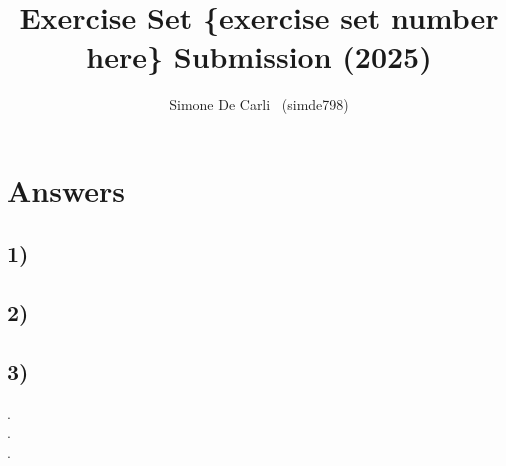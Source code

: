 \documentclass[10pt]{article}
\title{Exercise Set \{exercise set number here\} Submission (2025)}
\author{Simone De Carli \, (simde798)}
\begin{document}
\maketitle

\section*{Answers}

\subsection*{1)}
\subsection*{2)}
\subsection*{3)}
.\\ %
.\\ %
.\\ %
\end{document}
